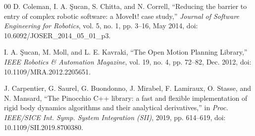 \documentclass[conference]{IEEEtran}
\begin{document}
{\begin{thebibliography}{00}
D. Coleman, I. A. {\c{S}}ucan, S. Chitta, and N. Correll, ``Reducing the barrier to entry of complex robotic software: a MoveIt! case study,'' \textit{Journal of Software Engineering for Robotics}, vol. 5, no. 1, pp. 3--16, May 2014, doi: 10.6092/JOSER\_2014\_05\_01\_p3.

I. A. {\c{S}}ucan, M. Moll, and L. E. Kavraki, ``The Open Motion Planning Library,'' \textit{IEEE Robotics \& Automation Magazine}, vol. 19, no. 4, pp. 72--82, Dec. 2012, doi: 10.1109/MRA.2012.2205651.

J. Carpentier, G. Saurel, G. Buondonno, J. Mirabel, F. Lamiraux, O. Stasse, and N. Mansard, ``The Pinocchio C++ library: a fast and flexible implementation of rigid body dynamics algorithms and their analytical derivatives,'' in \textit{Proc. IEEE/SICE Int. Symp. System Integration (SII)}, 2019, pp. 614--619, doi: 10.1109/SII.2019.8700380.

\end{thebibliography}
}
\end{document}
